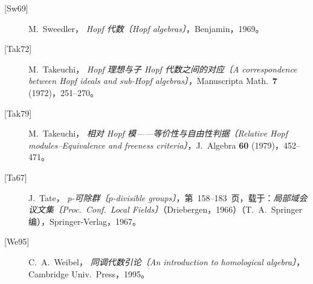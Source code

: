 \begin{description}
  \item[\textup{[Sw69]}] M.~Sweedler，
  \emph{Hopf 代数〔Hopf algebras〕}，Benjamin，1969。

  \item[\textup{[Tak72]}] M.~Takeuchi，
  \emph{Hopf 理想与子 Hopf 代数之间的对应〔A correspondence between Hopf ideals and sub-Hopf algebras〕}，Manuscripta Math.\ \textbf{7} (1972)，251--270。

  \item[\textup{[Tak79]}] M.~Takeuchi，
  \emph{相对 Hopf 模——等价性与自由性判据〔Relative Hopf modules--Equivalence and freeness criteria〕}，J.\ Algebra \textbf{60} (1979)，452--471。

  \item[\textup{[Ta67]}] J.~Tate，
  \emph{p-可除群〔\(p\)-divisible groups〕}，第~158--183~页，载于：\emph{局部域会议文集〔Proc.\ Conf.\ Local Fields〕}（Driebergen，1966）（T.~A.~Springer 编），Springer-Verlag，1967。

  \item[\textup{[We95]}] C.~A.~Weibel，
  \emph{同调代数引论〔An introduction to homological algebra〕}，Cambridge Univ.\ Press，1995。
\end{description}

